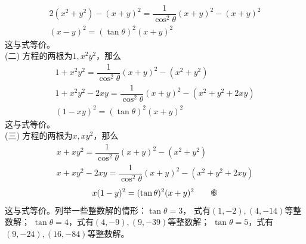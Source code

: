 \begin{enumerate}[label={【\textbf{例\thechapter.\arabic*}】},
 leftmargin=\inteval{\myenumleftmargin}pt,
 itemsep=\inteval{\myenumitempsep}pt,
 itemindent=\inteval{\myenumitemindent}pt]
\begin{gather*}
    2(x^2+y^2)-(x+y)^2=\dfrac{1}{\cos^2\theta}(x+y)^2 -(x+y)^2 \\
    (x-y)^2=(\tan\theta)^2(x+y)^2
\end{gather*}
这与式等价。\\
(二) 方程的两根为$ 1,x^2y^2 $，那么
\begin{gather*}
    1+x^2y^2=\dfrac{1}{\cos^2\theta}(x+y)^2-(x^2+y^2) \\
    1+x^2y^2-2xy=\dfrac{1}{\cos^2\theta}(x+y)^2-(x^2+y^2+2xy) \\
    (1-xy)^2=(\tan\theta)^2 (x+y)^2 
\end{gather*}
这与式等价。\\
(三) 方程的两根为$ x,xy^2 $，那么
\begin{gather*}
    x+xy^2=\dfrac{1}{\cos^2\theta}(x+y)^2-(x^2+y^2) \\
    x+xy^2-2xy=\dfrac{1}{\cos^2\theta}(x+y)^2-(x^2+y^2+2xy) 
\end{gather*}
\begin{gather}
    x(1-y)^2=(\tan\theta)^2(x+y)^2  \tag*{\ding{177}}
\end{gather}
这与式等价。列举一些整数解的情形：$ \tan\theta=3 $，
式有$ (1,-2),(4,-14) $等整数解；
$ \tan\theta=4 $，式有$ (4,-9),(9,-39) $等整数解；
$ \tan\theta=5 $，式有$ (9,-24),(16,-84) $等整数解。


\end{enumerate}
